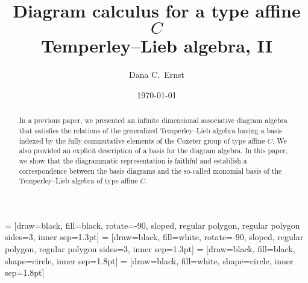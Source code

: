 \documentclass[11pt]{amsart}
\date{\today}
\theoremstyle{definition}
\numberwithin{equation}{section}
\renewcommand{\(}{\left(}
\renewcommand{\)}{\right)}
\begin{document}
 = [draw=black, fill=black, rotate=-90, sloped, regular polygon, regular polygon sides=3, inner sep=1.3pt]
 = [draw=black, fill=white, rotate=-90, sloped, regular polygon, regular polygon sides=3, inner sep=1.3pt]
 = [draw=black, fill=black, shape=circle, inner sep=1.8pt]
 = [draw=black, fill=white, shape=circle, inner sep=1.8pt]

\title[Diagram calculus for a type affine $C$ Temperley--Lieb algebra, II]{Diagram calculus for a type affine $C$ \\ Temperley--Lieb algebra, II}

\author[D.C.~Ernst]{Dana C.~Ernst}
\address{Department of Mathematics and Statistics, Northern Arizona University, Flagstaff, AZ 86011}



\begin{abstract}
In a previous paper, we presented an infinite dimensional associative diagram algebra that satisfies the relations of the generalized Temperley--Lieb algebra having a basis indexed by the fully commutative elements of the Coxeter group of type affine $C$.  We also provided an explicit description of a basis for the diagram algebra.  In this paper, we show that the diagrammatic representation is faithful and establish a correspondence between the basis diagrams and the so-called monomial basis of the Temperley--Lieb algebra of type affine $C$.
\end{abstract}

\maketitle

\end{document}
